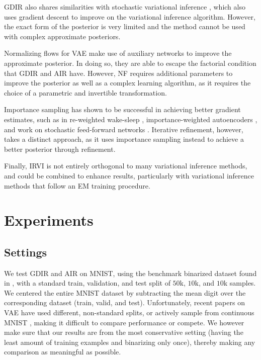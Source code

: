 \documentclass{article} %
\begin{document}
GDIR also shares similarities with stochastic variational inference
\citep{hoffman2013stochastic}, which also uses gradient descent to improve on the
variational inference algorithm. However, the exact form of the
posterior is very limited and the method cannot be used with complex approximate
posteriors. 

Normalizing flows for VAE \citep[NF,][]{rezende2015variational} make use of auxiliary
networks to improve the approximate posterior. In doing so, they are able to
escape the factorial condition that GDIR and AIR have. However, NF requires
additional parameters to improve the posterior as well as a complex learning
algorithm, as it requires the choice of a parametric and invertible transformation.

Importance sampling has shown to be successful in achieving better gradient
estimates, such as in re-weighted wake-sleep \citep[RWS,
][]{bornschein2014reweighted}, importance-weighted autoencoders
\citep[IWAE,][]{burda2015importance}, and work on stochastic feed-forward
networks \citep[SFFN, ][]{tang2013learning}. Iterative refinement, however, takes a distinct approach, as it uses
importance sampling instead to achieve a better posterior through refinement.

Finally, IRVI is not entirely orthogonal to many variational inference methods, and could be combined to enhance results, particularly with variational inference methods that follow an EM training procedure.

\section{Experiments}

\subsection{Settings}

We test GDIR and AIR on MNIST, using the benchmark binarized dataset found in
\citep{salakhutdinov2008quantitative}, with a standard train, validation, and
test split of $50$k, $10$k, and $10$k samples. We centered the entire MNIST dataset by subtracting the mean digit over the corresponding dataset (train, valid, and test). Unfortunately, recent papers on
VAE \citep{mnih2014neural, salimans2014markov} have used different, non-standard
splits, or actively sample from continuous MNIST \citep{burda2015importance},
making it difficult to compare performance or compete. We however make sure that our results are from
the most conservative setting (having the least amount of training examples and
binarizing only once),
thereby making any comparison as meaningful as possible.
\end{document}
